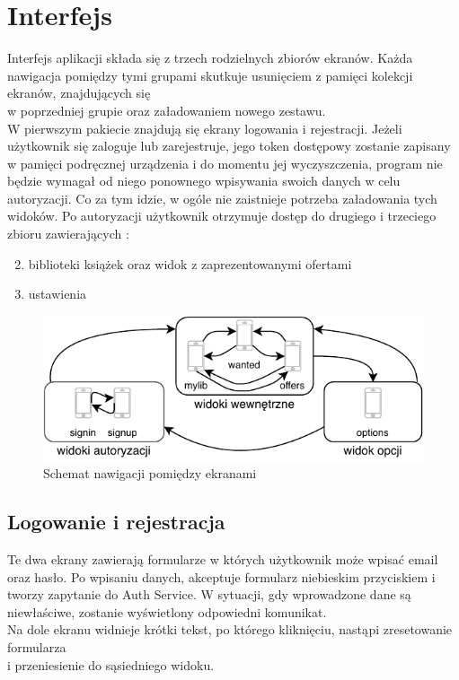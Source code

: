 \chapter{Interfejs}
\label{cha:interfejs}

Interfejs aplikacji składa się z trzech rodzielnych zbiorów ekranów. Każda nawigacja pomiędzy tymi grupami skutkuje usunięciem z pamięci kolekcji ekranów, znajdujących się \\w poprzedniej grupie oraz załadowaniem nowego zestawu.\\
W pierwszym pakiecie znajdują się ekrany logowania i rejestracji. Jeżeli użytkownik się zaloguje lub zarejestruje, jego token dostępowy zostanie zapisany w pamięci podręcznej urządzenia i do momentu jej wyczyszczenia, program nie będzie wymagał od niego ponownego wpisywania swoich danych w celu autoryzacji. Co za tym idzie, w ogóle nie zaistnieje potrzeba załadowania tych widoków.
Po autoryzacji użytkownik otrzymuje dostęp do drugiego i trzeciego zbioru zawierających :
\begin{enumerate}
    \setcounter{enumi}{1}
    \item biblioteki książek oraz widok z zaprezentowanymi ofertami
    \item ustawienia
\end{enumerate} 

\begin{figure}[H]
	\centering
	\includegraphics[width=\linewidth]{navig.pdf}
	\caption{Schemat nawigacji pomiędzy ekranami}
\end{figure}

\section{Logowanie i rejestracja}
Te dwa ekrany zawierają formularze w których użytkownik może wpisać email oraz hasło. Po wpisaniu danych, akceptuje formularz niebieskim przyciskiem i tworzy zapytanie do Auth Service. W sytuacji, gdy wprowadzone dane są niewłaściwe, zostanie wyświetlony odpowiedni komunikat.\\
Na dole ekranu widnieje krótki tekst, po którego kliknięciu, nastąpi zresetowanie formularza\\ i przeniesienie do sąsiedniego widoku.

